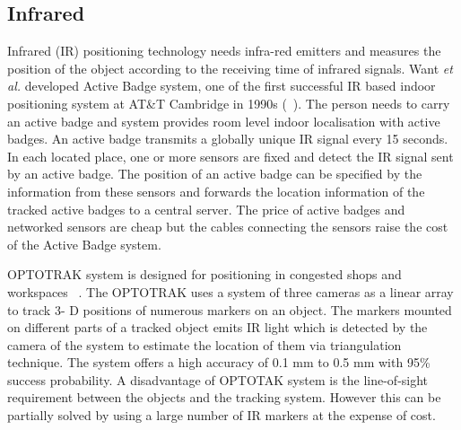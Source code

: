 \subsection{Infrared}
\label{sec:infrared}
Infrared (IR) positioning technology needs infra-red 
emitters and measures the position of the object
according to the receiving time of infrared signals. 
Want \emph{et al.} developed Active Badge system, one
of the first successful IR based indoor positioning system at
AT\&T Cambridge in 1990s  (~\citet{want92, harter02, abs08}). The person needs 
to carry an active badge and system provides room level 
indoor localisation with active badges.
An active badge transmits a globally unique IR signal every 15
seconds. In each located place, one or more sensors are fixed 
and detect the IR signal sent by
an active badge. 
The position of an active badge can be
specified by the information from these sensors 
and forwards the location information
of the tracked active badges to a central server.
The price of active badges and networked sensors
are cheap but the cables connecting the 
sensors raise the cost of the
Active Badge system. 

OPTOTRAK system is designed for positioning in 
congested shops and workspaces ~\cite{opo08}. The OPTOTRAK
uses a system of three cameras as a linear array to track 3-
D positions of numerous markers on an object. 
The markers mounted on different parts of a
tracked object emits IR light which is detected by the camera
of the system to estimate the location of them via triangulation 
technique. The system offers a high accuracy of 0.1 mm to 0.5 mm
with 95\% success probability. A disadvantage of OPTOTAK system
is the line-of-sight requirement between the objects and the
tracking system. However this can be partially solved 
by using a large number of IR markers at the expense of cost. 

